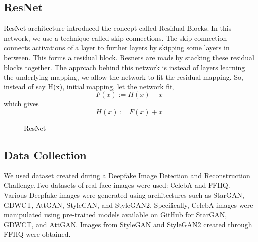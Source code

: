         \subsection{ResNet}
            ResNet\cite{DBLP:journals/corr/HeZRS15} architecture introduced the concept called Residual Blocks. In this network, we use a technique called skip connections. The skip connection connects activations of a  layer to further layers by skipping some layers in between. This forms a residual block. Resnets are made by stacking these residual blocks together. The approach behind this network is instead of layers learning the underlying mapping, we allow the network to fit the residual mapping. So, instead of say H(x), initial mapping, let the network fit,
            \begin{equation}
                F(x) := H(x) - x
            \end{equation}
            which gives
            \begin{equation}
                H(x) := F(x) + x
            \end{equation}
            \begin{figure}[hbt!]
                \caption{ResNet} \cite{enwiki:1205293224}
            \end{figure}

		\pagebreak
        \subsection{Data Collection}
        We used dataset created during a Deepfake Image Detection and Reconstruction Challenge.Two datasets of real face images were used: CelebA and FFHQ. Various Deepfake images were generated using architectures such as StarGAN, GDWCT, AttGAN, StyleGAN, and StyleGAN2. Specifically, CelebA images were manipulated using pre-trained models available on GitHub for StarGAN, GDWCT, and AttGAN. Images from StyleGAN and StyleGAN2 created through FFHQ were obtained.
        
